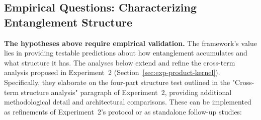 \documentclass[11pt]{article}
\theoremstyle{definition}
\begin{document}
\subsection{Empirical Questions: Characterizing Entanglement Structure}
\label{subsec:empirical-questions-entanglement}

\textbf{The hypotheses above require empirical validation.} The framework's value lies in providing testable predictions about how entanglement accumulates and what structure it has. The analyses below extend and refine the cross-term analysis proposed in Experiment~2 (Section~\ref{sec:exp-product-kernel}). Specifically, they elaborate on the four-part structure test outlined in the "Cross-term structure analysis" paragraph of Experiment~2, providing additional methodological detail and architectural comparisons. These can be implemented as refinements of Experiment~2's protocol or as standalone follow-up studies:
\end{document}
